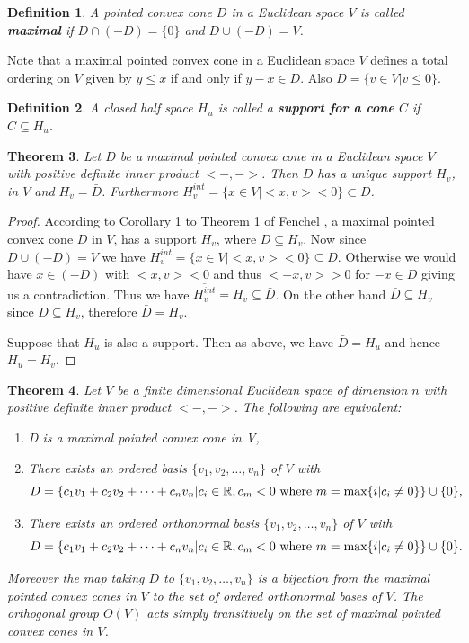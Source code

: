 \documentclass[psamsfonts]{amsart}
\numberwithin{equation}{subsection}
\theoremstyle{plain}
\newtheorem{theorem}{Theorem}[section]
\newtheorem{definition}[theorem]{Definition}
\theoremstyle{definition}
\theoremstyle{remark}
\begin{document}
\begin{definition} A  pointed convex cone $D$ in a Euclidean space $V$  is called {\bf maximal} if $D \cap (-D) = \{0\}$ and $D \cup (-D) = V$. 
\end{definition}




Note that a maximal pointed convex cone  in a Euclidean space $V$   defines a total ordering on $V$ given by $y \leq x$ if and only if $y - x \in D$.  Also $D = \{v \in V | v \leq 0\}$. 

\begin{definition}
A closed half space $H_u$  is called a {\bf support  for a  cone} $C$ if $C \subseteq H_u$.
\end{definition}

\begin{theorem} \label{unique} Let $D$ be a maximal pointed convex cone in a Euclidean space $V$  with  positive definite inner product $<-, - >$. 
Then $D$ has a unique support  $H_v$,  in $V$ and $H_v = \bar{D}$. Furthermore  $H_v^{int} = \{x \in V | <x, v> < 0 \} \subset D$. 
\end{theorem}
\begin{proof} According to Corollary 1 to Theorem 1 of Fenchel \cite{Fenchel},  a maximal pointed convex cone $D$  in $V$,  has a support $H_{v}$, where 
$D \subseteq H_{v}$. Now since $D \cup (-D) = V$ we have $H_v^{int} = \{x \in V | <x, v> < 0 \} \subseteq D$. Otherwise we would have $x \in (-D)$ with $<x, v> < 0$ and thus $<-x, v> > 0$ for $-x \in D$ giving us a contradiction. Thus we have 
$\overline{H_v^{int}}  =  H_{v} \subseteq \bar{D}$.  On the other hand $\bar{D} \subseteq H_{v}$  since $D \subseteq H_{v}$,
therefore $\bar{D} = H_v$. 

 Suppose that $H_{u}$ is also a support. Then as above, we have $\bar{D} = H_u$ and hence $H_u = H_v$. 
\end{proof}



\begin{theorem} \label{equivalence} Let $V$ be a finite dimensional Euclidean  space of dimension $n$ with positive definite inner product $< - , - >$. The following are equivalent:
\begin{enumerate}
\item D is a maximal pointed convex cone in V,
\item There exists an ordered basis $\{v_1, v_2, \dots , v_n \}$ of $V$ with $$D = \{c_1v_1 + c_2v_2 + \dots + c_nv_n | c_i \in \Bbb{R},  c_m < 0 \ \mbox{where} \ m = \mbox{max}\{i | 
c_i \not= 0 \} \} \cup \{0\},$$
\item There exists an ordered  orthonormal basis $\{v_1, v_2, \dots , v_n \}$ of $V$ with $$D = \{c_1v_1 + c_2v_2 + \dots + c_nv_n | c_i \in \Bbb{R},  c_m < 0 \ \mbox{where} \ m = \mbox{max}\{i | 
c_i \not= 0 \} \}  \cup \{0\}.$$
\end{enumerate}
Moreover the map taking $D$ to $\{v_1, v_2, \dots , v_n \}$ is a bijection from the maximal pointed convex cones in $V$ to the set of  ordered  orthonormal bases of $V$. 
The orthogonal  group $O(V)$ acts simply transitively on the set of maximal pointed convex cones in $V$. 
\end{theorem}
\end{document}
